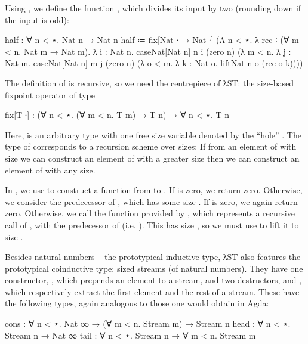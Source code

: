 Using , we define the function , which divides its
input by two (rounding down if the input is odd):
\begin{code}
  half : ∀ n < ⋆. Nat n → Nat n
  half ≔ fix[Nat ∙ → Nat ∙]
          (Λ n < ⋆. λ rec ∶ (∀ m < n. Nat m → Nat m). λ i : Nat n.
            caseNat[Nat n] n i
              (zero n)
              (λ m < n. λ j : Nat m. caseNat[Nat n] m j
                (zero n)
                (λ o < m. λ k : Nat o. liftNat n o (rec o k))))
\end{code}
The definition of  is recursive, so we need the centrepiece of λST:
the size-based fixpoint operator  of type
\begin{code}
  fix[T ∙] : (∀ n < ⋆. (∀ m < n. T m) → T n) → ∀ n < ⋆. T n
\end{code}
Here,  is an arbitrary type with one free size variable denoted by the
\enquote{hole} . The type of  corresponds to a recursion
scheme over sizes: If from an element of  with size  we can
construct an element of  with a greater size  then we can
construct an element of  with any size.

In , we use  to construct a function from  to . If  is zero, we return zero. Otherwise, we
consider the predecessor  of , which has some size . If  is zero, we again return zero. Otherwise, we call the
function  provided by , which represents a recursive call
of , with the predecessor of  (i.e. ). This
has size , so we must use  to lift it to size .

Besides natural numbers -- the prototypical inductive type, λST also features
the prototypical coinductive type: sized streams (of natural numbers). They have
one constructor, , which prepends an element to a stream, and two
destructors,  and , which respectively extract the first
element and the rest of a stream. These have the following types, again analogous
to those one would obtain in Agda:
\begin{code}
  cons : ∀ n < ⋆. Nat ∞ → (∀ m < n. Stream m) → Stream n
  head : ∀ n < ⋆. Stream n → Nat ∞
  tail : ∀ n < ⋆. Stream n → ∀ m < n. Stream m
\end{code}


